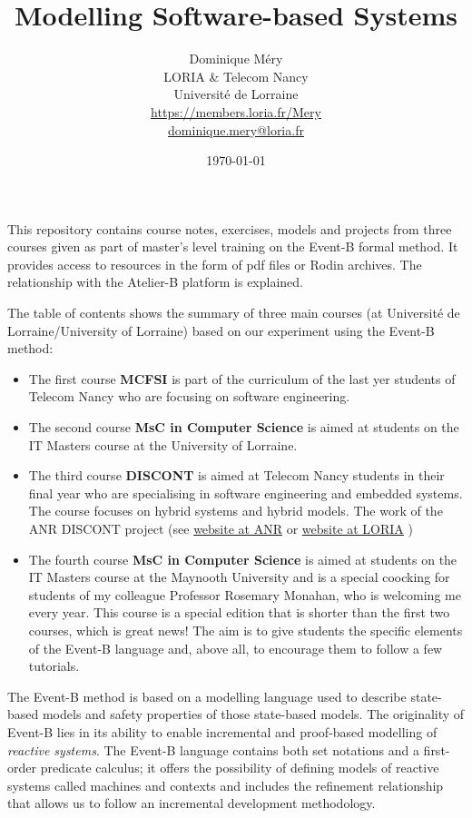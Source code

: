 \documentclass[ 12pt]{article}
\title{Modelling Software-based Systems}
\author{Dominique M\'ery\\
LORIA \& Telecom Nancy\\ Universit\'e de Lorraine\\
\url{https://members.loria.fr/Mery}\\ \url{dominique.mery@loria.fr}}
\date{\today}
\begin{document}
  \setcounter{ex}{1}
\maketitle

This repository contains course notes, exercises, models and projects
from three courses given as part of master's level training on the
Event-B formal method. It provides access to resources in the form of
pdf files or Rodin archives. The relationship with the Atelier-B
platform is explained.

The table
of contents shows the  summary of three main courses (at Université de 
 Lorraine/University of Lorraine)  based on our
experiment using the  Event-B method:
\begin{itemize}
\item The first course \textbf{MCFSI} is part of the curriculum of the last yer
  students of Telecom Nancy  who are  focusing on software
  engineering.
\item  The second course  \textbf{MsC in Computer Science} is aimed at students on the IT Masters course
  at the University of Lorraine.
\item  The third course \textbf{DISCONT} is aimed at Telecom Nancy students in their final year who are specialising in software engineering and embedded systems. The course focuses on hybrid systems and hybrid models. The work of the ANR DISCONT project (see 
\href{https://anr.fr/Projet-ANR-17-CE25-0005}{
   website at ANR} or  \href{https://discont.loria.fr}{  website at
   LORIA} )

 
\item The fourth course  \textbf{MsC in Computer Science} is aimed at students on the IT Masters course
  at the Maynooth  University   and is a special coocking for students
  of my colleague Professor Rosemary Monahan, who is welcoming me every
  year. This course is a special edition that is shorter than the first two courses, which is great news! The aim is to give students the specific elements of the Event-B language and, above all, to encourage them to follow a few tutorials.  
\end{itemize}



  The Event-B  method is based on a modelling
 language used to describe state-based models and  safety
 properties of those state-based models.  The originality of  Event-B
 lies in its ability  to
 enable incremental and proof-based modelling of \textit{reactive
   systems}. The  Event-B   language contains both set notations and a
 first-order predicate calculus; it offers the possibility of defining
 models of reactive systems called machines and contexts and includes
  the refinement relationship that allows us to follow an incremental
  development methodology.  
\end{document}
